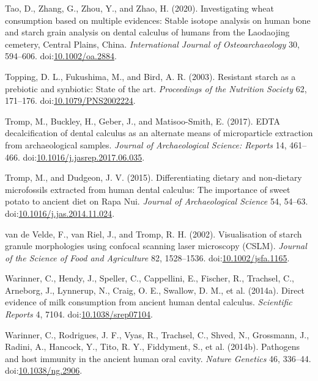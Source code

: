 \documentclass[utf8]{frontiers/frontiersSCNS}
\newlength{\cslhangindent}
\newlength{\cslentryspacingunit} %
\newenvironment{CSLReferences}[2] %
 {%
  \setlength{\parindent}{0pt}
  \ifodd #1
  \let\oldpar\par
  \def\par{\hangindent=\cslhangindent\oldpar}
  \fi
  \setlength{\parskip}{#2\cslentryspacingunit}
 }%
 {}
\begin{document}
\begin{CSLReferences}{1}{0}
\leavevmode{}%
Tao, D., Zhang, G., Zhou, Y., and Zhao, H. (2020). Investigating wheat consumption based on multiple evidences: {Stable} isotope analysis on human bone and starch grain analysis on dental calculus of humans from the {Laodaojing} cemetery, {Central Plains}, {China}. \emph{International Journal of Osteoarchaeology} 30, 594--606. doi:\href{https://doi.org/10.1002/oa.2884}{10.1002/oa.2884}.

\leavevmode{}%
Topping, D. L., Fukushima, M., and Bird, A. R. (2003). Resistant starch as a prebiotic and synbiotic: State of the art. \emph{Proceedings of the Nutrition Society} 62, 171--176. doi:\href{https://doi.org/10.1079/PNS2002224}{10.1079/PNS2002224}.

\leavevmode{}%
Tromp, M., Buckley, H., Geber, J., and Matisoo-Smith, E. (2017). {EDTA} decalcification of dental calculus as an alternate means of microparticle extraction from archaeological samples. \emph{Journal of Archaeological Science: Reports} 14, 461--466. doi:\href{https://doi.org/10.1016/j.jasrep.2017.06.035}{10.1016/j.jasrep.2017.06.035}.

\leavevmode{}%
Tromp, M., and Dudgeon, J. V. (2015). Differentiating dietary and non-dietary microfossils extracted from human dental calculus: The importance of sweet potato to ancient diet on {Rapa Nui}. \emph{Journal of Archaeological Science} 54, 54--63. doi:\href{https://doi.org/10.1016/j.jas.2014.11.024}{10.1016/j.jas.2014.11.024}.

\leavevmode{}%
van de Velde, F., van Riel, J., and Tromp, R. H. (2002). Visualisation of starch granule morphologies using confocal scanning laser microscopy ({CSLM}). \emph{Journal of the Science of Food and Agriculture} 82, 1528--1536. doi:\href{https://doi.org/10.1002/jsfa.1165}{10.1002/jsfa.1165}.

\leavevmode{}%
Warinner, C., Hendy, J., Speller, C., Cappellini, E., Fischer, R., Trachsel, C., Arneborg, J., Lynnerup, N., Craig, O. E., Swallow, D. M., et al. (2014a). Direct evidence of milk consumption from ancient human dental calculus. \emph{Scientific Reports} 4, 7104. doi:\href{https://doi.org/10.1038/srep07104}{10.1038/srep07104}.

\leavevmode{}%
Warinner, C., Rodrigues, J. F., Vyas, R., Trachsel, C., Shved, N., Grossmann, J., Radini, A., Hancock, Y., Tito, R. Y., Fiddyment, S., et al. (2014b). Pathogens and host immunity in the ancient human oral cavity. \emph{Nature Genetics} 46, 336--44. doi:\href{https://doi.org/10.1038/ng.2906}{10.1038/ng.2906}.


\end{CSLReferences}
\end{document}
